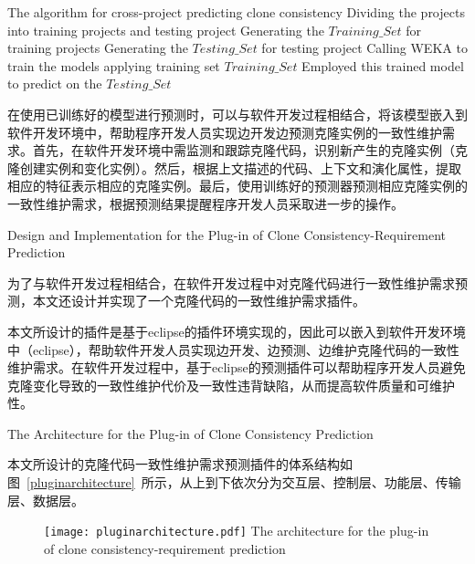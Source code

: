 \vspace{1em}
\begin{minipage}{0.8\textwidth}
\centering
\begin{algorithm}[H]
 {The algorithm for cross-project predicting clone consistency}
\label{alg-crossperdiction}
Dividing the projects into training projects and testing project\;
Generating the $Training\_{Set}$ for training projects\;
Generating the $Testing\_{Set}$ for testing project\;
Calling WEKA to train the models applying training set $Training\_{Set}$\;
Employed this trained model to predict on the $Testing\_{Set}$\;
\end{algorithm}
\end{minipage}
\vspace{1em}

在使用已训练好的模型进行预测时，可以与软件开发过程相结合，将该模型嵌入到软件开发环境中，帮助程序开发人员实现边开发边预测克隆实例的一致性维护需求。首先，在软件开发环境中需监测和跟踪克隆代码，识别新产生的克隆实例（克隆创建实例和变化实例）。然后，根据上文描述的代码、上下文和演化属性，提取相应的特征表示相应的克隆实例。最后，使用训练好的预测器预测相应克隆实例的一致性维护需求，根据预测结果提醒程序开发人员采取进一步的操作。

{Design and Implementation for the Plug-in of Clone Consistency-Requirement Prediction}

为了与软件开发过程相结合，在软件开发过程中对克隆代码进行一致性维护需求预测，本文还设计并实现了一个克隆代码的一致性维护需求插件。

本文所设计的插件是基于eclipse的插件环境实现的，因此可以嵌入到软件开发环境中（eclipse），帮助软件开发人员实现边开发、边预测、边维护克隆代码的一致性维护需求。在软件开发过程中，基于eclipse的预测插件可以帮助程序开发人员避免克隆变化导致的一致性维护代价及一致性违背缺陷，从而提高软件质量和可维护性。

{The Architecture for the Plug-in of Clone Consistency Prediction}

本文所设计的克隆代码一致性维护需求预测插件的体系结构如图~\ref{pluginarchitecture}~所示，从上到下依次分为交互层、控制层、功能层、传输层、数据层。

\begin{figure}[h]
\centering
\texttt{[image: pluginarchitecture.pdf]}
{The architecture for the plug-in of clone consistency-requirement prediction}
\vspace{-1em}
\end{figure}


